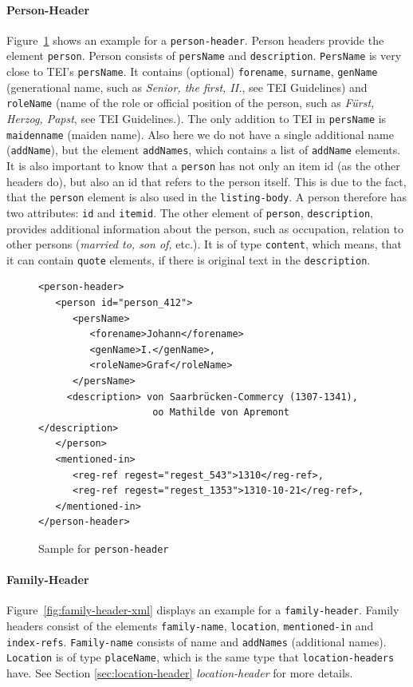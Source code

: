 \paragraph{Person-Header}
\label{sec:person-header}
Figure~\ref{fig:person-header-xml} shows an example for a
\texttt{person-header}. Person headers provide the element
\texttt{person}. Person consists of \texttt{persName} and
\texttt{description}. \texttt{PersName} is very close to TEI's
\texttt{persName}. It contains (optional) \texttt{forename},
\texttt{surname}, \texttt{genName} (generational name, such as
\textit{Senior, the first, II.}, see TEI Guidelines) and
\texttt{roleName} (name of the role or official position of the
person, such as \textit{Fürst, Herzog, Papst}, see TEI Guidelines.).
The only addition to TEI in \texttt{persName} is \texttt{maidenname}
(maiden name). Also here we do not have a single additional name
(\texttt{addName}), but the element \texttt{addNames}, which contains
a list of \texttt{addName} elements. It is also important to know that
a \texttt{person} has not only an item id (as the other headers do),
but also an id that refers to the person itself. This is due to the
fact, that the \texttt{person} element is also used in the
\texttt{listing-body}. A person therefore has two attributes:
\texttt{id} and \texttt{itemid}. The other element of \texttt{person},
\texttt{description}, provides additional information about the
person, such as occupation, relation to other persons (\textit{married
  to, son of,} etc.). It is of type \texttt{content}, which means,
that it can contain \texttt{quote} elements, if there is original text
in the \texttt{description}.

\begin{figure}[H]
\centering
\begin{verbatim}
<person-header>
   <person id="person_412">
      <persName>
         <forename>Johann</forename>
         <genName>I.</genName>,
         <roleName>Graf</roleName>
      </persName>
     <description> von Saarbrücken-Commercy (1307-1341),
                    oo Mathilde von Apremont    </description>
   </person>
   <mentioned-in>
      <reg-ref regest="regest_543">1310</reg-ref>,
      <reg-ref regest="regest_1353">1310-10-21</reg-ref>,
   </mentioned-in>
</person-header>
\end{verbatim}
\caption{Sample for \texttt{person-header}}
\label{fig:person-header-xml}
\end{figure}

\paragraph{Family-Header}
Figure~\ref{fig:family-header-xml} displays an example for a
\texttt{family-header}. Family headers consist of the elements
\texttt{family-name}, \texttt{location}, \texttt{mentioned-in} and
\texttt{index-refs}. \texttt{Family-name} consists of name and
\texttt{addNames} (additional names). \texttt{Location} is of type
\texttt{placeName}, which is the same type that
\texttt{location-headers} have. See Section \ref{sec:location-header}
\textit{location-header} for more details.

